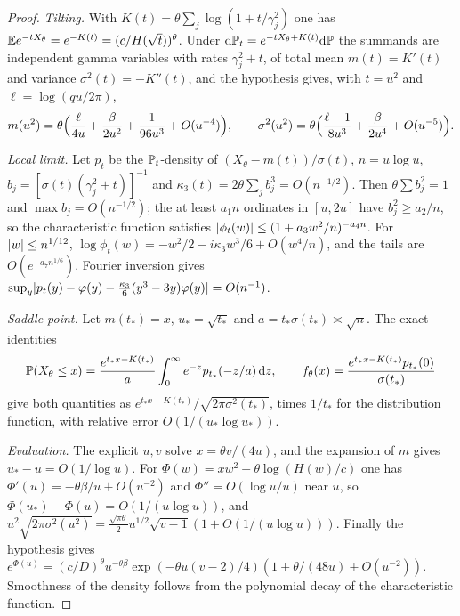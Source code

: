 \begin{proof}
\emph{Tilting.} With $K(t)=\theta\sum_j\log(1+t/\gamma_j^2)$ one has
$\mathbb{E} e^{-tX_\theta}=e^{-K(t)}=(c/H(\sqrt t))^\theta$. Under
$\mathrm{d}\mathbb{P}_t=e^{-tX_\theta+K(t)}\mathrm{d}\mathbb{P}$ the summands are independent gamma variables with
rates $\gamma_j^2+t$, of total mean $m(t)=K'(t)$ and variance $\sigma^2(t)=-K''(t)$, and the
hypothesis gives, with $t=u^2$ and $\ell=\log(qu/2\pi)$,
\[
 m(u^2)=\theta\Bigl(\frac\ell{4u}+\frac\beta{2u^2}+\frac1{96u^3}+O(u^{-4})\Bigr),\qquad
 \sigma^2(u^2)=\theta\Bigl(\frac{\ell-1}{8u^3}+\frac\beta{2u^4}+O(u^{-5})\Bigr).
\]

\emph{Local limit.} Let $p_t$ be the $\mathbb{P}_t$-density of $(X_\theta-m(t))/\sigma(t)$,
$n=u\log u$, $b_j=[\sigma(t)(\gamma_j^2+t)]^{-1}$ and
$\kappa_3(t)=2\theta\sum_jb_j^3=O(n^{-1/2})$. Then $\theta\sum b_j^2=1$ and $\max b_j=O(n^{-1/2})$;
the at least $a_1n$ ordinates in $[u,2u]$ have $b_j^2\ge a_2/n$, so the characteristic function
satisfies $\lvert\phi_t(w)\rvert\le(1+a_3w^2/n)^{-a_4n}$. For $\lvert w\rvert\le n^{1/12}$,
$\log\phi_t(w)=-w^2/2-i\kappa_3w^3/6+O(w^4/n)$, and the tails are $O(e^{-a_7n^{1/6}})$. Fourier
inversion gives $\sup_y\lvert p_t(y)-\varphi(y)-\frac{\kappa_3}6(y^3-3y)\varphi(y)\rvert=O(n^{-1})$.

\emph{Saddle point.} Let $m(t_*)=x$, $u_*=\sqrt{t_*}$ and $a=t_*\sigma(t_*)\asymp\sqrt n$. The
exact identities
\[
 \mathbb{P}(X_\theta\le x)=\frac{e^{t_*x-K(t_*)}}a\int_0^\infty e^{-z}p_{t_*}(-z/a)\,\mathrm{d} z,\qquad
 f_\theta(x)=\frac{e^{t_*x-K(t_*)}p_{t_*}(0)}{\sigma(t_*)}
\]
give both quantities as $e^{t_*x-K(t_*)}/\sqrt{2\pi\sigma^2(t_*)}$, times $1/t_*$ for the
distribution function, with relative error $O(1/(u_*\log u_*))$.

\emph{Evaluation.} The explicit $u,v$ solve $x=\theta v/(4u)$, and the expansion of $m$ gives
$u_*-u=O(1/\log u)$. For $\Phi(w)=xw^2-\theta\log(H(w)/c)$ one has
$\Phi'(u)=-\theta\beta/u+O(u^{-2})$ and $\Phi''=O(\log u/u)$ near $u$, so
$\Phi(u_*)-\Phi(u)=O(1/(u\log u))$, and
$u^2\sqrt{2\pi\sigma^2(u^2)}=\frac{\sqrt{\pi\theta}}2u^{1/2}\sqrt{v-1}(1+O(1/(u\log u)))$.
Finally the hypothesis gives
$e^{\Phi(u)}=(c/D)^\theta u^{-\theta\beta}\exp(-\theta u(v-2)/4)(1+\theta/(48u)+O(u^{-2}))$.
Smoothness of the density follows from the polynomial decay of the characteristic function.
\end{proof}

